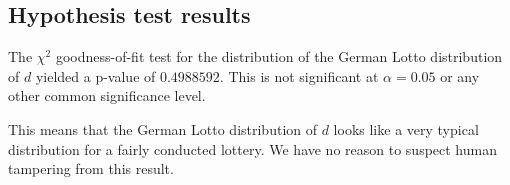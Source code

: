\subsection{Hypothesis test results}

The $\chi^2$ goodness-of-fit test for the distribution of the German Lotto distribution 
of $d$ yielded a p-value of $0.4988592$. This is not significant at $\alpha = 0.05$ or 
any other common significance level.

This means that the German Lotto distribution of $d$ looks like a very typical
distribution for a fairly conducted lottery. We have no reason to suspect
human tampering from this result.
